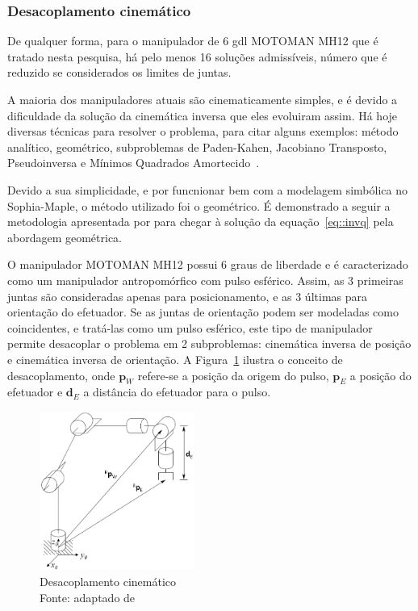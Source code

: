 \subsubsection{Desacoplamento cinemático}

De qualquer forma, para o manipulador de 6 gdl MOTOMAN MH12 que é tratado nesta
pesquisa, há pelo menos 16 soluções admissíveis, número que é reduzido se
considerados os limites de juntas.

A maioria dos manipuladores atuais são cinematicamente simples, e é devido a
dificuldade da solução da cinemática inversa que eles evoluiram assim. Há hoje
diversas técnicas para resolver o problema, para citar alguns exemplos: método
analítico, geométrico, subproblemas de Paden-Kahen, Jacobiano Transposto,
Pseudoinversa e Mínimos Quadrados Amortecido~\cite{buss2004introduction}. 

Devido a sua simplicidade, e por funcnionar bem com a modelagem simbólica
no Sophia-Maple, o método utilizado foi o geométrico. É demonstrado a seguir a
metodologia apresentada por \citet{spong2006robot} para chegar à solução da
equação~\ref{eq::invq} pela abordagem geométrica.

O manipulador MOTOMAN MH12 possui 6 graus de liberdade e é caracterizado como um
manipulador antropomórfico com pulso esférico. Assim, as 3 primeiras juntas são
consideradas apenas para posicionamento, e as 3 últimas para orientação do
efetuador. Se as juntas de orientação podem ser modeladas como coincidentes, e
tratá-las como um pulso esférico, este tipo de manipulador permite desacoplar
o problema em 2 subproblemas:
cinemática inversa de posição e cinemática inversa de orientação. A
Figura~\ref{fig::decoupling} ilustra o conceito de desacoplamento, onde
$\mathbf{p}_W$ refere-se a posição da origem do pulso, $\mathbf{p}_E$ a posição
do efetuador e $\mathbf{d}_E$ a distância do efetuador para o pulso.

\begin{figure}[h]
	\centering 
 	\includegraphics[width=0.45\textwidth]{figs/decoupling}
 	\caption[Desacoplamento cinemático]{Desacoplamento cinemático \\ Fonte:
 	adaptado de~\cite{spong2006robot}}
 	\label{fig::decoupling}
\end{figure}


